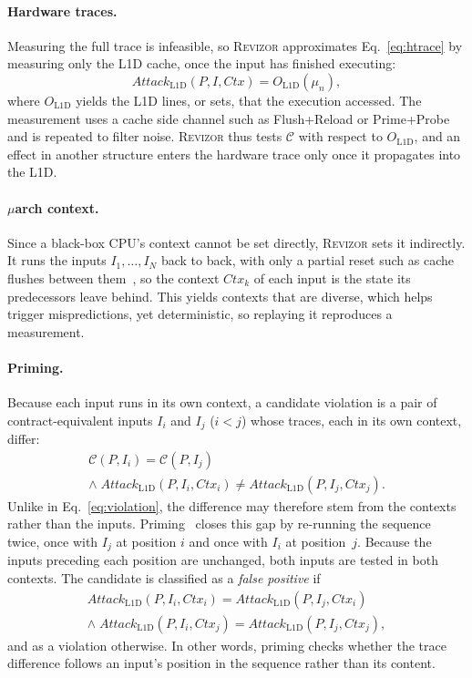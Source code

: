 \documentclass[letterpaper,twocolumn,10pt]{article}
\makeatletter
\theoremstyle{definition}
\providecommand{\ol}{\ensuremath{O_{\mathrm{L1D}}}}
\providecommand{\Al}{\ensuremath{\mathit{Attack}_{\mathrm{L1D}}}}
\def\uarch@bold#1#2\@nil{\if b#1\boldmath\fi}
\DeclareRobustCommand{\uarch}{{\expandafter\uarch@bold\f@series\@nil\ensuremath{\mu}}arch\xspace}
\makeatother
\begin{document}
\paragraph{Hardware traces.}
Measuring the full trace is infeasible, so \textsc{Revizor} approximates
Eq.~\eqref{eq:htrace} by measuring only the L1D cache, once the input has finished
executing:
\begin{equation}
\Al(P,I,\mathit{Ctx}) = \ol(\mu_n),
\label{eq:htrace-l1d}
\end{equation}
where $\ol$ yields the L1D lines, or sets, that the execution accessed.
The measurement uses a cache side channel such as Flush+Reload or Prime+Probe and is
repeated to filter noise. \textsc{Revizor} thus tests $\mathcal{C}$ with respect to
$\ol$, and an effect in another structure enters the hardware trace only
once it propagates into the L1D.
 
\paragraph{\uarch context.}
Since a black-box CPU's context cannot be set directly, \textsc{Revizor} sets it indirectly.
It runs the inputs $I_1,\dots,I_N$ back to back, with only a partial reset such as cache
flushes between them~\cite{revizor,hide_seek}, so the context $\mathit{Ctx}_k$ of each input is
the state its predecessors leave behind. This yields contexts that are diverse, which helps
trigger mispredictions, yet deterministic, so replaying it reproduces a measurement.
 
\paragraph{Priming.}
Because each input runs in its own context, a candidate violation is a pair of
contract-equivalent inputs $I_i$ and $I_j$ ($i<j$) whose traces, each in its own
context, differ:
\begin{equation}
\begin{gathered}
\mathcal{C}(P,I_i) = \mathcal{C}(P,I_j) \\
\land\;
\Al(P,I_i,\mathit{Ctx}_i) \neq
\Al(P,I_j,\mathit{Ctx}_j).
\end{gathered}
\label{eq:candidate}
\end{equation}
\noindent Unlike in Eq.~\eqref{eq:violation}, the difference may therefore stem from the
contexts rather than the inputs. Priming~\cite{revizor} closes this gap by re-running the sequence
twice, once with $I_j$ at position $i$ and once with $I_i$ at position~$j$. Because
the inputs preceding each position are unchanged, both inputs are tested in
both contexts. The candidate is classified as a \emph{false positive} if
\begin{equation}
\begin{gathered}
\Al(P,I_i,\mathit{Ctx}_i) =
\Al(P,I_j,\mathit{Ctx}_i) \\
\land\;
\Al(P,I_i,\mathit{Ctx}_j) =
\Al(P,I_j,\mathit{Ctx}_j),
\end{gathered}
\label{eq:priming}
\end{equation}
\noindent and as a violation otherwise. In other words, priming checks whether
the trace difference follows an input's position in the sequence rather than
its content.
\end{document}
